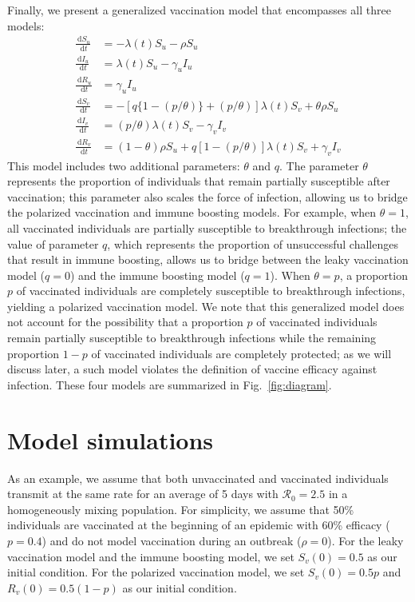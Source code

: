 \documentclass[12pt]{article}
\newcommand{\fref}[1]{Fig.~\ref{fig:#1}}
\newcommand{\dd}[1]{\ensuremath{\, \mathrm{d}#1}}
\begin{document}
Finally, we present a generalized vaccination model that encompasses all three models:
\begin{align}
\frac{\dd S_u}{\dd t} &= - \lambda(t) S_u - \rho S_u \\
\frac{\dd I_u}{\dd t} &= \lambda(t) S_u - \gamma_u I_u \\
\frac{\dd R_u}{\dd t} &= \gamma_u I_u \\
\frac{\dd S_v}{\dd t} &= - [q \{1-(p/\theta)\} + (p/\theta)] \lambda(t) S_v + \theta \rho S_u \\
\frac{\dd I_v}{\dd t} &= (p/\theta) \lambda(t) S_v - \gamma_v I_v \\
\frac{\dd R_v}{\dd t} &= (1 - \theta) \rho S_u + q [1-(p/\theta)] \lambda(t) S_v + \gamma_v I_v
\end{align}
This model includes two additional parameters: $\theta$ and $q$.
The parameter $\theta$ represents the proportion of individuals that remain partially susceptible after vaccination;
this parameter also scales the force of infection, allowing us to bridge the polarized vaccination and immune boosting models.
For example, when $\theta = 1$, all vaccinated individuals are partially susceptible to breakthrough infections;
the value of parameter $q$, which represents the proportion of unsuccessful challenges that result in immune boosting, allows us to bridge between the leaky vaccination model ($q=0$) and the immune boosting model ($q = 1$).
When $\theta = p$, a proportion $p$ of vaccinated individuals are completely susceptible to breakthrough infections, yielding a polarized vaccination model.
We note that this generalized model does not account for the possibility that a proportion $p$ of vaccinated individuals remain partially susceptible to breakthrough infections while the remaining proportion $1-p$ of vaccinated individuals are completely protected; 
as we will discuss later, a such model violates the definition of vaccine efficacy against infection.
These four models are summarized in \fref{diagram}.

\section*{Model simulations}

As an example, we assume that both unvaccinated and vaccinated individuals transmit at the same rate for an average of 5 days with $\mathcal R_0 = 2.5$ in a homogeneously mixing population.
For simplicity, we assume that 50\% individuals are vaccinated at the beginning of an epidemic with 60\% efficacy ($p=0.4$) and do not model vaccination during an outbreak ($\rho = 0$).
For the leaky vaccination model and the immune boosting model, we set $S_v(0) = 0.5$ as our initial condition.
For the polarized vaccination model, we set $S_v(0) = 0.5 p$ and $R_v(0) = 0.5 (1-p)$ as our initial condition.
\end{document}
